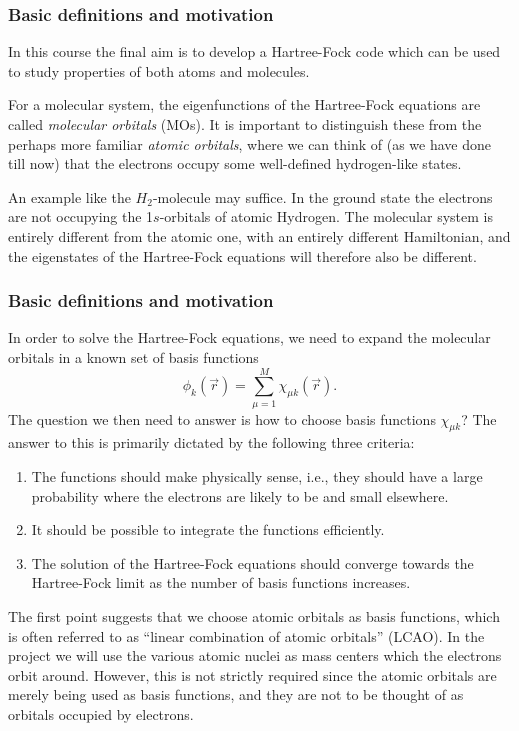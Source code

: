 \frame
{
  \frametitle{Basic definitions and motivation}
\begin{small}
{\scriptsize
In this course the final aim is to develop a Hartree-Fock code which can be used to study properties of
both atoms and molecules.

For a molecular system, the eigenfunctions of the Hartree-Fock equations are called
\emph{molecular orbitals} (MOs). It is important to distinguish these
from the perhaps more familiar \emph{atomic orbitals}, where we can think of (as we have done till now)
that the electrons occupy some well-defined hydrogen-like states.

An example like the $H_2$-molecule may suffice.
In the ground state the electrons are not occupying the 1$s$-orbitals of atomic Hydrogen. The
molecular system is entirely different from the atomic one, with an entirely different Hamiltonian,
and the eigenstates of the Hartree-Fock equations will therefore also be different.
}
\end{small}
}




\frame
{
  \frametitle{Basic definitions and motivation}
\begin{small}
{\scriptsize
In order to solve the Hartree-Fock equations, we need to expand the molecular orbitals in a known
set of basis functions
\begin{equation}
 \phi_k(\vec r) = \sum_{\mu=1}^M\chi_{\mu k}(\vec r).
\end{equation}
The question we then need to answer is how to choose basis functions $\chi_{\mu k}$? The answer to this
is primarily dictated by the following three criteria:
\begin{enumerate}
 \item The functions should make physically sense, i.e., they should have a large probability where
  the electrons are likely to be and small elsewhere.
 \item It should be possible to integrate the functions efficiently.
 \item The solution of the Hartree-Fock equations should converge towards the Hartree-Fock limit
       as the number of basis functions increases.
\end{enumerate}
The first point suggests that we choose atomic orbitals as basis functions,  which is often
referred to as ``linear combination of atomic orbitals'' (LCAO). In the project we will use the various atomic nuclei as mass centers which the electrons orbit around. However, this is not strictly required since the
atomic orbitals are merely being used as basis functions, and they are not to be thought of
as orbitals occupied by electrons. 
}
\end{small}
}





